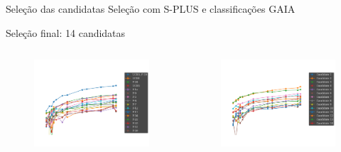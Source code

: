 \begin{frame}[c]{Seleção das candidatas}
\scriptsize
Seleção com S-PLUS e classificações GAIA

Seleção final: 14 candidatas
\begin{columns}[c]
        \begin{column}{0.48\textwidth}
            \begin{figure}
                \centering
                \includegraphics[width=\textwidth]{images/photospec_ucds.png}
            \end{figure}
        \end{column}
        \begin{column}{0.48\textwidth}
            \begin{figure}
                \centering
                \includegraphics[width=\textwidth]{images/photospec_candidatas.png}
            \end{figure}
        \end{column}
    \end{columns}
\end{frame}

